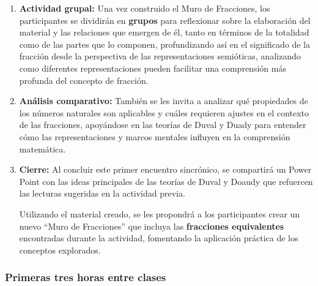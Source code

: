 \begin{enumerate}
	\item \textbf{Actividad grupal:} Una vez construido el Muro de Fracciones, los participantes se dividirán en \textbf{grupos} para reflexionar sobre la elaboración del material y las relaciones que emergen de él, tanto en términos de la totalidad como de las partes que lo componen, profundizando así en el significado de la fracción desde la perspectiva de las representaciones semióticas, analizando como diferentes representaciones pueden facilitar una comprensión más profunda del concepto de fracción.
	
	\item \textbf{Análisis comparativo:} También se les invita a analizar qué propiedades de los números naturales son aplicables y cuáles requieren ajustes en el contexto de las fracciones, apoyándose en las teorías de Duval y Duady para entender cómo las representaciones y marcos mentales influyen en la comprensión matemática.
	
	\item \textbf{Cierre:} Al concluir este primer encuentro sincrónico, se compartirá un Power Point con las ideas principales de las teorías de Duval y Doaudy que refuercen las lecturas sugeridas en la actividad previa.
	
	Utilizando el material creado, se les propondrá a los participantes crear un nuevo ``Muro de Fracciones'' que incluya las \textbf{fracciones equivalentes} encontradas durante la actividad, fomentando la aplicación práctica de los conceptos explorados.
\end{enumerate}

\subsubsection{Primeras tres horas entre clases}

